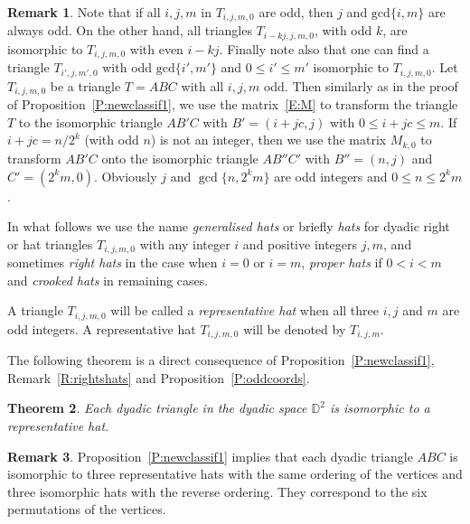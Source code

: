 \documentclass[12pt]{amsart}
\def\mr{\mathrm}
\def\mbD{\mathbb{D}}
\theoremstyle{plain}
\newtheorem{theorem}{Theorem}[section]
\theoremstyle{definition}
\newtheorem{remark}[theorem]{Remark}
\numberwithin{equation}{section}
\begin{document}
\begin{remark}\label{R:oddcoords}
Note that if all $i, j, m$ in $T_{i,j,m,0}$ are odd, then $j$ and $\mr{gcd}\{i,m\}$ are always
odd. On the other hand, all triangles $T_{i-kj,j,m,0}$, with odd $k$, are isomorphic to
$T_{i,j,m,0}$ with even $i-kj$. Finally note also that one can find a triangle $T_{i',j,m',0}$
with odd $\mr{gcd}\{i',m'\}$ and $0 \leq i' \leq m'$ isomorphic to $T_{i,j,m,0}$. Let
$T_{i,j,m,0}$ be a triangle $T = ABC$ with all $i, j, m$ odd. Then similarly as in the proof of Proposition~\ref{P:newclassif1}, we use the matrix~\eqref{E:M} to transform the triangle $T$ to the isomorphic triangle $AB'C$ with $B' = (i+jc,j)$ with $0 \leq i+jc \leq
m$. If $i+jc = n/2^k$ (with odd $n$) is not an integer, then we use the matrix $M_{k,0}$ to
transform $AB'C$ onto the isomorphic triangle $AB''C'$ with $B'' = (n,j)$ and $C' = (2^k m,0)$. Obviously $j$ and $\gcd\{n,2^k m\}$ are odd integers and $0 \leq n \leq 2^k m$.
\end{remark}



In what follows we use the name \emph{generalised hats} or briefly \emph{hats} for dyadic right or hat triangles $T_{i,j,m,0}$ with any integer $i$ and positive integers $j, m$, and sometimes \emph{right hats} in the case when $i = 0$ or $i = m$, \emph{proper hats} if $0 < i < m$ and \emph{crooked hats} in remaining cases.


A triangle $T_{i,j,m,0}$ will be called a \emph{representative hat} when all three $i, j$ and
$m$ are odd integers.
A representative hat $T_{i,j,m,0}$ will be denoted by $T_{i,j,m}$.


The following theorem is a direct consequence of Proposition~\ref{P:newclassif1},
Remark~\ref{R:rightshats} and Proposition~\ref{P:oddcoords}.



\begin{theorem}\label{T:reprhats}
Each dyadic triangle in the dyadic space $\mbD^2$ is isomorphic to a representative hat.
\end{theorem}



\begin{remark}\label{R:6reprhats}
Proposition~\ref{P:newclassif1} implies that each dyadic triangle $ABC$ is isomorphic to three
representative hats with the same ordering of the vertices and three isomorphic hats with the
reverse ordering. They correspond to the six permutations of the vertices.
\end{remark}
\end{document}
